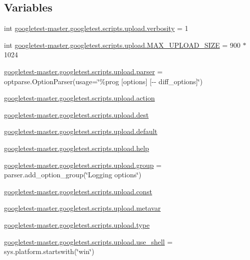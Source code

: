 \subsection*{Variables}
\begin{DoxyCompactItemize}
\item 
int \mbox{\hyperlink{namespacegoogletest-master_1_1googletest_1_1scripts_1_1upload_a03617af729988fd9568b82aa68e14352}{googletest-\/master.\+googletest.\+scripts.\+upload.\+verbosity}} = 1
\item 
int \mbox{\hyperlink{namespacegoogletest-master_1_1googletest_1_1scripts_1_1upload_aad7dd536c8f2abc394104dabe3a34e54}{googletest-\/master.\+googletest.\+scripts.\+upload.\+M\+A\+X\+\_\+\+U\+P\+L\+O\+A\+D\+\_\+\+S\+I\+ZE}} = 900 $\ast$ 1024
\item 
\mbox{\hyperlink{namespacegoogletest-master_1_1googletest_1_1scripts_1_1upload_adc639adf2b0f649fcad1b442cceec0b7}{googletest-\/master.\+googletest.\+scripts.\+upload.\+parser}} = optparse.\+Option\+Parser(usage=\char`\"{}\%prog \mbox{[}options\mbox{]} \mbox{[}-\/-\/ diff\+\_\+options\mbox{]}\char`\"{})
\item 
\mbox{\hyperlink{namespacegoogletest-master_1_1googletest_1_1scripts_1_1upload_aac5337183ad153044ea3d97e6bc195a9}{googletest-\/master.\+googletest.\+scripts.\+upload.\+action}}
\item 
\mbox{\hyperlink{namespacegoogletest-master_1_1googletest_1_1scripts_1_1upload_a302ffae92e8d65e66fc7d28a9f73f6f9}{googletest-\/master.\+googletest.\+scripts.\+upload.\+dest}}
\item 
\mbox{\hyperlink{namespacegoogletest-master_1_1googletest_1_1scripts_1_1upload_a13594628cd38f0d0041eb83936cfa527}{googletest-\/master.\+googletest.\+scripts.\+upload.\+default}}
\item 
\mbox{\hyperlink{namespacegoogletest-master_1_1googletest_1_1scripts_1_1upload_ad997f484682cc73db470d6fc1926ec35}{googletest-\/master.\+googletest.\+scripts.\+upload.\+help}}
\item 
\mbox{\hyperlink{namespacegoogletest-master_1_1googletest_1_1scripts_1_1upload_ab725b951e9e38d5348cf39af5bf25603}{googletest-\/master.\+googletest.\+scripts.\+upload.\+group}} = parser.\+add\+\_\+option\+\_\+group(\char`\"{}Logging options\char`\"{})
\item 
\mbox{\hyperlink{namespacegoogletest-master_1_1googletest_1_1scripts_1_1upload_a3979bbca87b29a0a67fc1d505c7bb2e9}{googletest-\/master.\+googletest.\+scripts.\+upload.\+const}}
\item 
\mbox{\hyperlink{namespacegoogletest-master_1_1googletest_1_1scripts_1_1upload_a42f4cd04e1f49c0706a596e4f83f2705}{googletest-\/master.\+googletest.\+scripts.\+upload.\+metavar}}
\item 
\mbox{\hyperlink{namespacegoogletest-master_1_1googletest_1_1scripts_1_1upload_a5ce929e2bcf8ae75c3a24d670ea07581}{googletest-\/master.\+googletest.\+scripts.\+upload.\+type}}
\item 
\mbox{\hyperlink{namespacegoogletest-master_1_1googletest_1_1scripts_1_1upload_a528745e4e1cecb9949829c7187bf156f}{googletest-\/master.\+googletest.\+scripts.\+upload.\+use\+\_\+shell}} = sys.\+platform.\+startswith(\char`\"{}win\char`\"{})
\end{DoxyCompactItemize}
